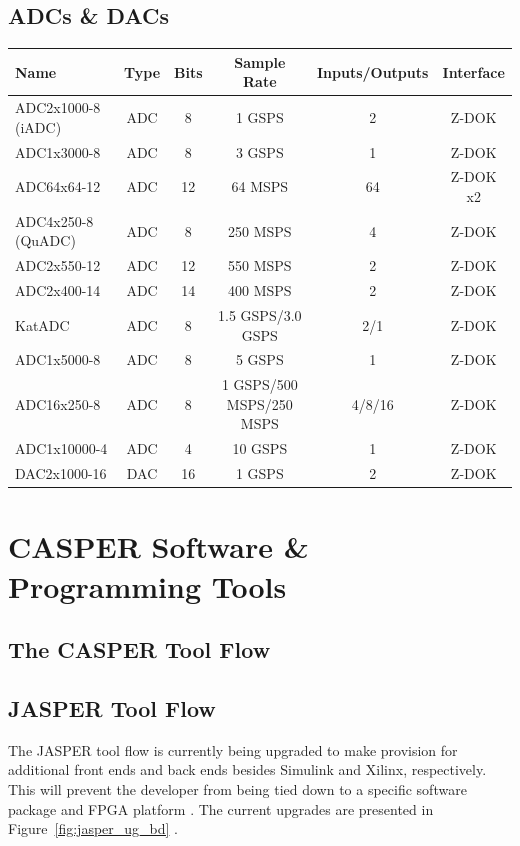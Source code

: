 \documentclass{ws-jai}
\begin{document}
\subsection{ADCs \& DACs}

\begin{tabular}{lccccc}
Name & Type & Bits & Sample Rate & Inputs/Outputs & Interface \\
\hline
ADC2x1000-8 (iADC) & ADC & 8 & 1 GSPS & 2 & Z-DOK \\
ADC1x3000-8 & ADC & 8 & 3 GSPS & 1 & Z-DOK \\
ADC64x64-12 & ADC & 12 & 64 MSPS & 64 & Z-DOK x2 \\
ADC4x250-8 (QuADC) & ADC & 8 & 250 MSPS & 4 & Z-DOK \\
ADC2x550-12 & ADC & 12 & 550 MSPS & 2 & Z-DOK \\
ADC2x400-14 & ADC & 14 & 400 MSPS & 2 & Z-DOK \\
KatADC & ADC & 8 & 1.5 GSPS/3.0 GSPS & 2/1 & Z-DOK \\
ADC1x5000-8 & ADC & 8 & 5 GSPS & 1 & Z-DOK \\
ADC16x250-8 & ADC & 8 & 1 GSPS/500 MSPS/250 MSPS & 4/8/16 & Z-DOK \\
ADC1x10000-4 & ADC & 4 & 10 GSPS & 1 & Z-DOK \\
DAC2x1000-16 & DAC & 16 & 1 GSPS & 2 & Z-DOK \\
\end{tabular}

\section{CASPER Software \& Programming Tools} \label{sec:Software}

\subsection{The CASPER Tool Flow}


\subsection{JASPER Tool Flow}


The JASPER tool flow is currently being upgraded to make provision for additional front ends and back ends besides Simulink and Xilinx, respectively. This will prevent the developer from being tied down to a specific software package and FPGA platform \cite{Isaac16}. The current upgrades are presented in Figure~\ref{fig:jasper_ug_bd} \cite{Isaac16}.
\end{document}
